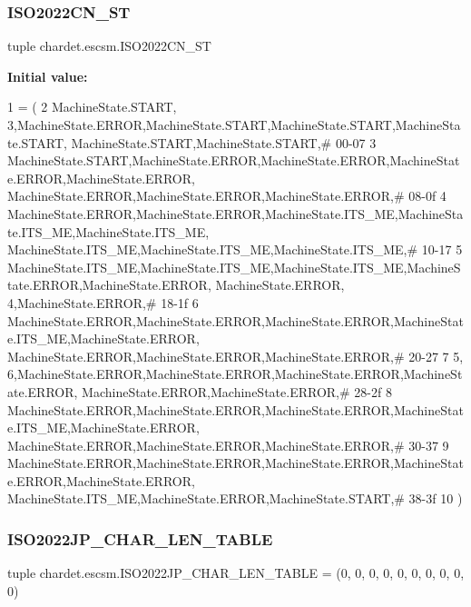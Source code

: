 \subsubsection{\texorpdfstring{I\+S\+O2022\+C\+N\+\_\+\+ST}{ISO2022CN\_ST}}
{\footnotesize\ttfamily tuple chardet.\+escsm.\+I\+S\+O2022\+C\+N\+\_\+\+ST}

{\bfseries Initial value\+:}
\begin{DoxyCode}
1 =  (
2 MachineState.START,     3,MachineState.ERROR,MachineState.START,MachineState.START,MachineState.START,
      MachineState.START,MachineState.START,\textcolor{comment}{# 00-07}
3 MachineState.START,MachineState.ERROR,MachineState.ERROR,MachineState.ERROR,MachineState.ERROR,
      MachineState.ERROR,MachineState.ERROR,MachineState.ERROR,\textcolor{comment}{# 08-0f}
4 MachineState.ERROR,MachineState.ERROR,MachineState.ITS\_ME,MachineState.ITS\_ME,MachineState.ITS\_ME,
      MachineState.ITS\_ME,MachineState.ITS\_ME,MachineState.ITS\_ME,\textcolor{comment}{# 10-17}
5 MachineState.ITS\_ME,MachineState.ITS\_ME,MachineState.ITS\_ME,MachineState.ERROR,MachineState.ERROR,
      MachineState.ERROR,     4,MachineState.ERROR,\textcolor{comment}{# 18-1f}
6 MachineState.ERROR,MachineState.ERROR,MachineState.ERROR,MachineState.ITS\_ME,MachineState.ERROR,
      MachineState.ERROR,MachineState.ERROR,MachineState.ERROR,\textcolor{comment}{# 20-27}
7      5,     6,MachineState.ERROR,MachineState.ERROR,MachineState.ERROR,MachineState.ERROR,
      MachineState.ERROR,MachineState.ERROR,\textcolor{comment}{# 28-2f}
8 MachineState.ERROR,MachineState.ERROR,MachineState.ERROR,MachineState.ITS\_ME,MachineState.ERROR,
      MachineState.ERROR,MachineState.ERROR,MachineState.ERROR,\textcolor{comment}{# 30-37}
9 MachineState.ERROR,MachineState.ERROR,MachineState.ERROR,MachineState.ERROR,MachineState.ERROR,
      MachineState.ITS\_ME,MachineState.ERROR,MachineState.START,\textcolor{comment}{# 38-3f}
10 )
\end{DoxyCode}
\mbox{\label{namespacechardet_1_1escsm_a8789f7f61337d9c581a62633bc119e61}} 
\subsubsection{\texorpdfstring{I\+S\+O2022\+J\+P\+\_\+\+C\+H\+A\+R\+\_\+\+L\+E\+N\+\_\+\+T\+A\+B\+LE}{ISO2022JP\_CHAR\_LEN\_TABLE}}
{\footnotesize\ttfamily tuple chardet.\+escsm.\+I\+S\+O2022\+J\+P\+\_\+\+C\+H\+A\+R\+\_\+\+L\+E\+N\+\_\+\+T\+A\+B\+LE = (0, 0, 0, 0, 0, 0, 0, 0, 0, 0)}

